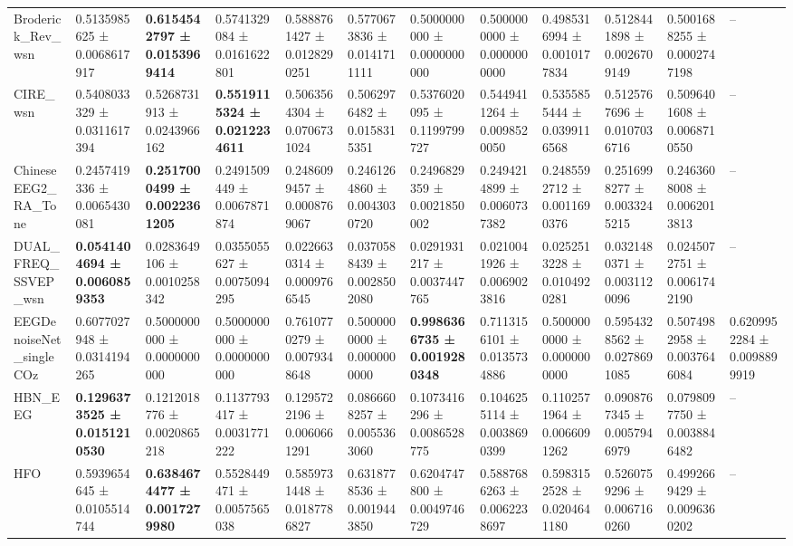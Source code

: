 \begin{table}[htbp]
\begin{tabular}{llllllllllll}
Broderick_Rev_wsn & 0.5135985625 ± 0.0068617917 & \bfseries 0.6154542797 ± 0.0153969414 & 0.5741329084 ± 0.0161622801 & 0.5888761427 ± 0.0128290251 & 0.5770673836 ± 0.0141711111 & 0.5000000000 ± 0.0000000000 & 0.5000000000 ± 0.0000000000 & 0.4985316994 ± 0.0010177834 & 0.5128441898 ± 0.0026709149 & 0.5001688255 ± 0.0002747198 & -- \\
CIRE_wsn & 0.5408033329 ± 0.0311617394 & 0.5268731913 ± 0.0243966162 & \bfseries 0.5519115324 ± 0.0212234611 & 0.5063564304 ± 0.0706731024 & 0.5062976482 ± 0.0158315351 & 0.5376020095 ± 0.1199799727 & 0.5449411264 ± 0.0098520050 & 0.5355855444 ± 0.0399116568 & 0.5125767696 ± 0.0107036716 & 0.5096401608 ± 0.0068710550 & -- \\
ChineseEEG2_RA_Tone & 0.2457419336 ± 0.0065430081 & \bfseries 0.2517000499 ± 0.0022361205 & 0.2491509449 ± 0.0067871874 & 0.2486099457 ± 0.0008769067 & 0.2461264860 ± 0.0043030720 & 0.2496829359 ± 0.0021850002 & 0.2494214899 ± 0.0060737382 & 0.2485592712 ± 0.0011690376 & 0.2516998277 ± 0.0033245215 & 0.2463608008 ± 0.0062013813 & -- \\
DUAL_FREQ_SSVEP_wsn & \bfseries 0.0541404694 ± 0.0060859353 & 0.0283649106 ± 0.0010258342 & 0.0355055627 ± 0.0075094295 & 0.0226630314 ± 0.0009766545 & 0.0370588439 ± 0.0028502080 & 0.0291931217 ± 0.0037447765 & 0.0210041926 ± 0.0069023816 & 0.0252513228 ± 0.0104920281 & 0.0321480371 ± 0.0031120096 & 0.0245072751 ± 0.0061742190 & -- \\
EEGDenoiseNet_singleCOz & 0.6077027948 ± 0.0314194265 & 0.5000000000 ± 0.0000000000 & 0.5000000000 ± 0.0000000000 & 0.7610770279 ± 0.0079348648 & 0.5000000000 ± 0.0000000000 & \bfseries 0.9986366735 ± 0.0019280348 & 0.7113156101 ± 0.0135734886 & 0.5000000000 ± 0.0000000000 & 0.5954328562 ± 0.0278691085 & 0.5074982958 ± 0.0037646084 & 0.6209952284 ± 0.0098899919 \\
HBN_EEG & \bfseries 0.1296373525 ± 0.0151210530 & 0.1212018776 ± 0.0020865218 & 0.1137793417 ± 0.0031771222 & 0.1295722196 ± 0.0060661291 & 0.0866608257 ± 0.0055363060 & 0.1073416296 ± 0.0086528775 & 0.1046255114 ± 0.0038690399 & 0.1102571964 ± 0.0066091262 & 0.0908767345 ± 0.0057946979 & 0.0798097750 ± 0.0038846482 & -- \\
HFO & 0.5939654645 ± 0.0105514744 & \bfseries 0.6384674477 ± 0.0017279980 & 0.5528449471 ± 0.0057565038 & 0.5859731448 ± 0.0187786827 & 0.6318778536 ± 0.0019443850 & 0.6204747800 ± 0.0049746729 & 0.5887686263 ± 0.0062238697 & 0.5983152528 ± 0.0204641180 & 0.5260759296 ± 0.0067160260 & 0.4992669429 ± 0.0096360202 & -- \\

\end{tabular}
\end{table}
